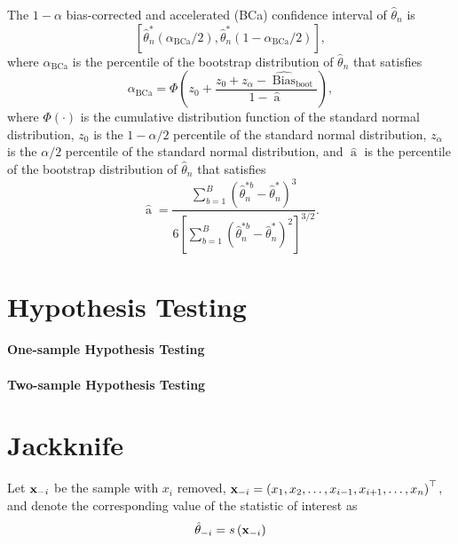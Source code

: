 The $1-\alpha$ bias-corrected and accelerated (BCa) confidence interval of $\hat{\theta}_{n}$ is
\begin{equation}
	\left[\hat{\theta}_{n}^{*}\left(\alpha_{\text{BCa}}/2\right),\hat{\theta}_{n}^{*}\left(1-\alpha_{\text{BCa}}/2\right)\right],
\end{equation}
where $\alpha_{\text{BCa}}$ is the percentile of the bootstrap distribution of $\hat{\theta}_{n}$ that satisfies
\begin{equation}
	\alpha_{\text{BCa}}=\Phi\left(z_{0}+\frac{z_{0}+z_{\alpha}-\widehat{\operatorname{Bias}}_{\text{boot}}}{1-\widehat{\operatorname{a}}}\right),
\end{equation}
where $\Phi(\cdot)$ is the cumulative distribution function of the standard normal distribution, $z_{0}$ is the $1-\alpha/2$ percentile of the standard normal distribution, $z_{\alpha}$ is the $\alpha/2$ percentile of the standard normal distribution, and $\widehat{\operatorname{a}}$ is the percentile of the bootstrap distribution of $\hat{\theta}_{n}$ that satisfies
\begin{equation}
	\widehat{\operatorname{a}}=\frac{\sum_{b=1}^{B}\left(\hat{\theta}_{n}^{*b}-\hat{\theta}_{n}^{*}\right)^{3}}{6\left[\sum_{b=1}^{B}\left(\hat{\theta}_{n}^{*b}-\hat{\theta}_{n}^{*}\right)^{2}\right]^{3/2}}.
\end{equation}

\section{Hypothesis Testing}

\paragraph{One-sample Hypothesis Testing}

\paragraph{Two-sample Hypothesis Testing}

\section{Jackknife}

Let ${\bf x}_{-i}$ be the sample with $x_{i}$ removed, ${\bf x}_{-i}=\left(x_{1},x_{2},\ldots,x_{i-1},x_{i+1},\ldots,x_{n}\right)^{\top}$, and denote the corresponding value of the statistic of interest as
\begin{equation}
	\hat{\theta}_{-i}=s\left({\bf x}_{-i}\right)
\end{equation}

